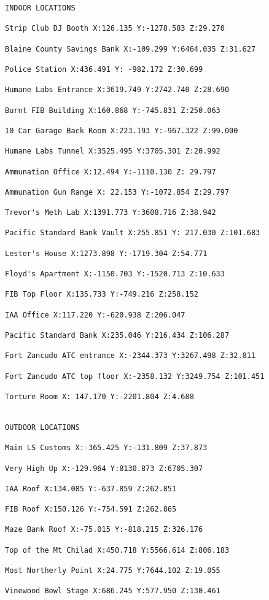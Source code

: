 \documentclass[
  openany]{book}
\begin{document}
\begin{verbatim}
INDOOR LOCATIONS
 
Strip Club DJ Booth X:126.135 Y:-1278.583 Z:29.270

Blaine County Savings Bank X:-109.299 Y:6464.035 Z:31.627

Police Station X:436.491 Y: -982.172 Z:30.699

Humane Labs Entrance X:3619.749 Y:2742.740 Z:28.690

Burnt FIB Building X:160.868 Y:-745.831 Z:250.063

10 Car Garage Back Room X:223.193 Y:-967.322 Z:99.000

Humane Labs Tunnel X:3525.495 Y:3705.301 Z:20.992

Ammunation Office X:12.494 Y:-1110.130 Z: 29.797

Ammunation Gun Range X: 22.153 Y:-1072.854 Z:29.797

Trevor's Meth Lab X:1391.773 Y:3608.716 Z:38.942

Pacific Standard Bank Vault X:255.851 Y: 217.030 Z:101.683

Lester's House X:1273.898 Y:-1719.304 Z:54.771

Floyd's Apartment X:-1150.703 Y:-1520.713 Z:10.633

FIB Top Floor X:135.733 Y:-749.216 Z:258.152

IAA Office X:117.220 Y:-620.938 Z:206.047

Pacific Standard Bank X:235.046 Y:216.434 Z:106.287

Fort Zancudo ATC entrance X:-2344.373 Y:3267.498 Z:32.811

Fort Zancudo ATC top floor X:-2358.132 Y:3249.754 Z:101.451

Torture Room X: 147.170 Y:-2201.804 Z:4.688

 
OUTDOOR LOCATIONS
 
Main LS Customs X:-365.425 Y:-131.809 Z:37.873

Very High Up X:-129.964 Y:8130.873 Z:6705.307

IAA Roof X:134.085 Y:-637.859 Z:262.851

FIB Roof X:150.126 Y:-754.591 Z:262.865

Maze Bank Roof X:-75.015 Y:-818.215 Z:326.176

Top of the Mt Chilad X:450.718 Y:5566.614 Z:806.183

Most Northerly Point X:24.775 Y:7644.102 Z:19.055

Vinewood Bowl Stage X:686.245 Y:577.950 Z:130.461


\end{verbatim}
\end{document}
